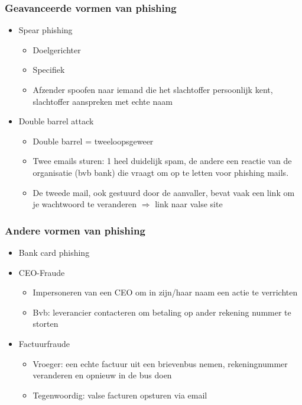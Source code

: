 \documentclass{article}
\begin{document}
\subsubsection{Geavanceerde vormen van phishing}

\begin{itemize}
    \item Spear phishing
    \begin{itemize}
        \item Doelgerichter
        \item Specifiek
        \item Afzender spoofen naar iemand die het slachtoffer persoonlijk kent, slachtoffer aanspreken met echte naam
    \end{itemize}
    \item Double barrel attack
    \begin{itemize}
        \item Double barrel = tweeloopsgeweer
        \item Twee emails sturen: 1 heel duidelijk spam, de andere een reactie van de organisatie (bvb bank) die vraagt om op te letten voor phishing mails. 
        \item De tweede mail, ook gestuurd door de aanvaller, bevat vaak een link om je wachtwoord te veranderen $\Rightarrow$ link naar valse site
    \end{itemize}
\end{itemize}

\subsubsection{Andere vormen van phishing}

\begin{itemize}
    \item Bank card phishing
    \item CEO-Fraude
    \begin{itemize}
        \item Impersoneren van een CEO om in zijn/haar naam een actie te verrichten
        \item Bvb: leverancier contacteren om betaling op ander rekening nummer te storten
    \end{itemize}
    \item Factuurfraude
    \begin{itemize}
        \item Vroeger: een echte factuur uit een brievenbus nemen, rekeningnummer veranderen en opnieuw in de bus doen
        \item Tegenwoordig: valse facturen opsturen via email
    \end{itemize}
\end{itemize}
\end{document}
